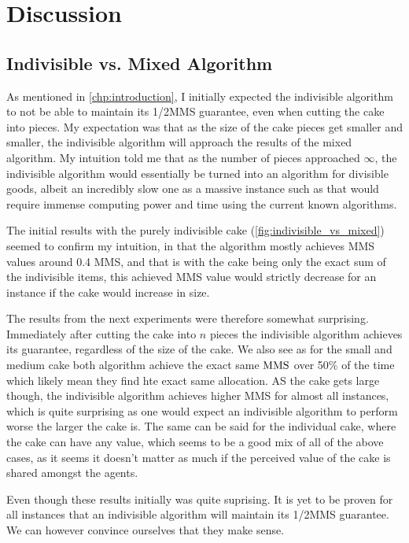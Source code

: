 \section{Discussion}\label{sec:discussion}


\subsection{Indivisible vs. Mixed Algorithm}
As mentioned in \autoref{chp:introduction}, I initially expected the indivisible algorithm to not be able to maintain its 1/2MMS guarantee, even when cutting the cake into pieces. My expectation was that as the size of the cake pieces get smaller and smaller, the indivisible algorithm will approach the results of the mixed algorithm. My intuition told me that as the number of pieces approached $\infty$, the indivisible algorithm would essentially be turned into an algorithm for divisible goods, albeit an incredibly slow one as a massive instance such as that would require immense computing power and time using the current known algorithms.

The initial results with the purely indivisible cake (\autoref{fig:indivisible_vs_mixed}) seemed to confirm my intuition, in that the algorithm mostly achieves MMS values around 0.4 MMS, and that is with the cake being only the exact sum of the indivisible items, this achieved MMS value would strictly decrease for an instance if the cake would increase in size.

The results from the next experiments were therefore somewhat surprising. Immediately after cutting the cake into $n$ pieces the indivisible algorithm achieves its guarantee, regardless of the size of the cake. We also see as for the small and medium cake both algorithm achieve the exact same $\text{MMS}$ over 50\% of the time which likely mean they find hte exact same allocation. AS the cake gets large though, the indivisible algorithm achieves higher MMS for almost all instances, which is quite surprising as one would expect an indivisible algorithm to perform worse the larger the cake is. The same can be said for the individual cake, where the cake can have any value, which seems to be a good mix of all of the above cases, as it seems it doesn't matter as much if the perceived value of the cake is shared amongst the agents.

Even though these results initially was quite suprising. It is yet to be proven for all instances that an indivisible algorithm will maintain its 1/2MMS guarantee. We can however convince ourselves that they make sense. 

